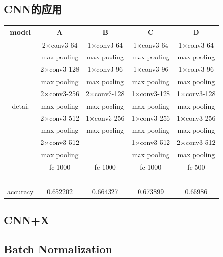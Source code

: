 \subsection{CNN的应用}
\begin{center}
\begin{tabular}{ccccc}
\toprule[2pt]
model  & A & B & C & D \\ 
\midrule[1pt]
\ & 2$\times$conv3-64 & 1$\times$conv3-64 & 1$\times$conv3-64 & 1$\times$conv3-64 \\ 
\ & max pooling & max pooling & max pooling & max pooling \\ 
\ & 2$\times$conv3-128 & 1$\times$conv3-96 & 1$\times$conv3-96 & 1$\times$conv3-96 \\ 
\ & max pooling & max pooling & max pooling & max pooling \\ 
\ & 2$\times$conv3-256 & 2$\times$conv3-128 & 1$\times$conv3-128 & 1$\times$conv3-128 \\  
detail & max pooling & max pooling & max pooling & max pooling \\  
\ & 2$\times$conv3-512 & 1$\times$conv3-256 & 1$\times$conv3-256 & 1$\times$conv3-256 \\ 
\ & max pooling & max pooling & max pooling & max pooling \\ 
\ & 2$\times$conv3-512 & \ & 1$\times$conv3-512 & 2$\times$conv3-512 \\ 
\ & max pooling & \ & max pooling & max pooling \\
\ & fc 1000 & fc 1000 & fc 1000 & fc 500 \\ 
\ & \ & \ & \ & \ \\ 
\midrule[1pt]
accuracy & 0.652202 & 0.664327 & 0.673899 & 0.65986 \\ 
\bottomrule[2pt]
\end{tabular} 
\end{center}

\subsection{CNN+X}



\subsection{Batch Normalization}


